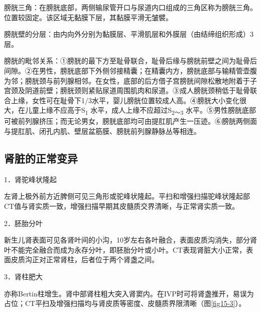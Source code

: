膀胱三角：在膀胱底部，两侧输尿管开口与尿道内口组成的三角区称为膀胱三角。位置较固定。该区域无黏膜下层，其黏膜平滑无皱襞。

膀胱壁的分层：由内向外分别为黏膜层、平滑肌层和外膜层（由结缔组织形成）3层。

膀胱的毗邻关系：①膀胱的最下方至耻骨联合，耻骨后缘与膀胱前壁之间为耻骨后间隙。②在男性，膀胱底部下外侧邻接精囊；在精囊内方，膀胱底部与输精管壶腹为邻；膀胱颈与前列腺相邻。在女性，底部的后方借子宫膀胱间隙松散地附着于子宫颈及阴道前壁；膀胱颈则紧贴尿道周围肌肉和尿道。③成人膀胱颈稍低于耻骨联合上缘，女性可在耻骨下1/3水平，婴儿膀胱位置较成人高。④膀胱大小变化很大，在儿童上缘不应高于S\textsubscript{1}
水平，成人上缘不应超过S\textsubscript{2～3}
水平。⑤男性膀胱底部可被前列腺挤压；而无论男女，膀胱底部均可由提肛肌产生一压迹。⑥膀胱两侧面与提肛肌、闭孔内肌、壁层盆筋膜、膀胱前列腺静脉丛等相连。

\subsection{肾脏的正常变异}

1．肾驼峰状隆起

左肾上极外前方近脾侧可见三角形或驼峰状隆起。平扫和增强扫描驼峰状隆起部CT值与肾实质一致，增强扫描早期其皮髓质交界清晰，与正常肾实质一致。

2．胚胎分叶

新生儿肾表面可见各肾叶间的小沟，10岁左右各叶融合，表面皮质沟消失，部分肾叶不能完全融合而成为永存分叶，即胚胎分叶或小叶。CT表现肾脏大小正常，表面皮质沟正对正常肾柱，后者位于两个肾盏之间。

3．肾柱肥大

亦称Bertin柱增生。肾中部肾柱粗大突入肾窦内。在IVP时可将肾盏推开，易误为占位；CT平扫及增强扫描均与肾皮质等密度、皮髓质界限清晰（图\ref{fig15-3}）。

